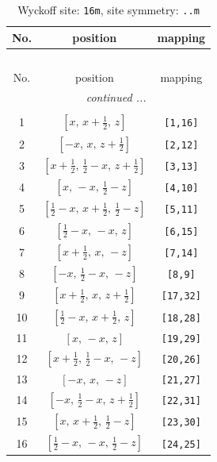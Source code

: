 \documentclass[fleqn,8pt]{jsarticle}
\begin{document}
\renewcommand{\arraystretch}{1.2}
\begin{longtable}{ccc}
\caption{Wyckoff site: {\tt 16m}, site symmetry: {\tt ..m}}
 \\
 \hline \hline
No. & position & mapping \\ \hline \endfirsthead

\multicolumn{2}{l}{\tablename\ \thetable{}} \\
 \hline \hline
No. & position & mapping \\ \hline \endhead

 \hline \hline
\multicolumn{2}{r}{\footnotesize\it continued ...} \\ \endfoot

 \hline \hline
\multicolumn{2}{r}{} \\ \endlastfoot

1 & $\left[ x,\, x + \frac{1}{2},\, z \right]$ & {\tt [1,16]} \\ \hline
2 & $\left[ - x,\, x,\, z + \frac{1}{2} \right]$ & {\tt [2,12]} \\ \hline
3 & $\left[ x + \frac{1}{2},\, \frac{1}{2} - x,\, z + \frac{1}{2} \right]$ & {\tt [3,13]} \\ \hline
4 & $\left[ x,\, - x,\, \frac{1}{2} - z \right]$ & {\tt [4,10]} \\ \hline
5 & $\left[ \frac{1}{2} - x,\, x + \frac{1}{2},\, \frac{1}{2} - z \right]$ & {\tt [5,11]} \\ \hline
6 & $\left[ \frac{1}{2} - x,\, - x,\, z \right]$ & {\tt [6,15]} \\ \hline
7 & $\left[ x + \frac{1}{2},\, x,\, - z \right]$ & {\tt [7,14]} \\ \hline
8 & $\left[ - x,\, \frac{1}{2} - x,\, - z \right]$ & {\tt [8,9]} \\ \hline
9 & $\left[ x + \frac{1}{2},\, x,\, z + \frac{1}{2} \right]$ & {\tt [17,32]} \\ \hline
10 & $\left[ \frac{1}{2} - x,\, x + \frac{1}{2},\, z \right]$ & {\tt [18,28]} \\ \hline
11 & $\left[ x,\, - x,\, z \right]$ & {\tt [19,29]} \\ \hline
12 & $\left[ x + \frac{1}{2},\, \frac{1}{2} - x,\, - z \right]$ & {\tt [20,26]} \\ \hline
13 & $\left[ - x,\, x,\, - z \right]$ & {\tt [21,27]} \\ \hline
14 & $\left[ - x,\, \frac{1}{2} - x,\, z + \frac{1}{2} \right]$ & {\tt [22,31]} \\ \hline
15 & $\left[ x,\, x + \frac{1}{2},\, \frac{1}{2} - z \right]$ & {\tt [23,30]} \\ \hline
16 & $\left[ \frac{1}{2} - x,\, - x,\, \frac{1}{2} - z \right]$ & {\tt [24,25]} \\
\end{longtable}
\end{document}
